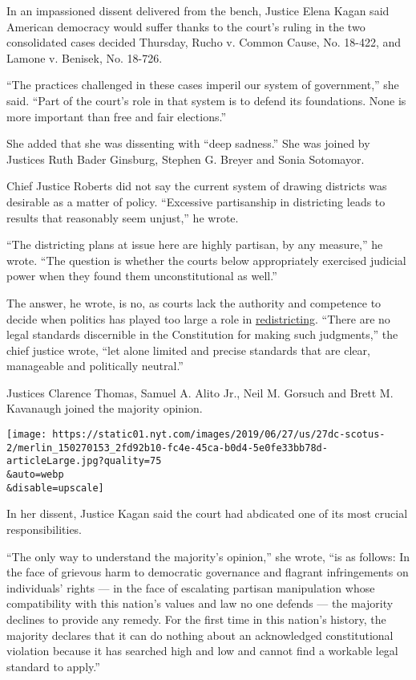 In an impassioned dissent delivered from the bench, Justice Elena Kagan
said American democracy would suffer thanks to the court's ruling in the
two consolidated cases decided Thursday, Rucho v. Common Cause, No.
18-422, and Lamone v. Benisek, No. 18-726.

``The practices challenged in these cases imperil our system of
government,'' she said. ``Part of the court's role in that system is to
defend its foundations. None is more important than free and fair
elections.''

She added that she was dissenting with ``deep sadness.'' She was joined
by Justices Ruth Bader Ginsburg, Stephen G. Breyer and Sonia Sotomayor.

Chief Justice Roberts did not say the current system of drawing
districts was desirable as a matter of policy. ``Excessive partisanship
in districting leads to results that reasonably seem unjust,'' he wrote.

``The districting plans at issue here are highly partisan, by any
measure,'' he wrote. ``The question is whether the courts below
appropriately exercised judicial power when they found them
unconstitutional as well.''

The answer, he wrote, is no, as courts lack the authority and competence
to decide when politics has played too large a role in
\href{https://www.nytimes.com/2020/07/21/us/politics/trump-immigrants-census-redistricting.html}{redistricting}.
``There are no legal standards discernible in the Constitution for
making such judgments,'' the chief justice wrote, ``let alone limited
and precise standards that are clear, manageable and politically
neutral.''

Justices Clarence Thomas, Samuel A. Alito Jr., Neil M. Gorsuch and Brett
M. Kavanaugh joined the majority opinion.

\texttt{[image: https://static01.nyt.com/images/2019/06/27/us/27dc-scotus-2/merlin\_150270153\_2fd92b10-fc4e-45ca-b0d4-5e0fe33bb78d-articleLarge.jpg?quality=75\\\&auto=webp\\\&disable=upscale]}

In her dissent, Justice Kagan said the court had abdicated one of its
most crucial responsibilities.

``The only way to understand the majority's opinion,'' she wrote, ``is
as follows: In the face of grievous harm to democratic governance and
flagrant infringements on individuals' rights --- in the face of
escalating partisan manipulation whose compatibility with this nation's
values and law no one defends --- the majority declines to provide any
remedy. For the first time in this nation's history, the majority
declares that it can do nothing about an acknowledged constitutional
violation because it has searched high and low and cannot find a
workable legal standard to apply.''

